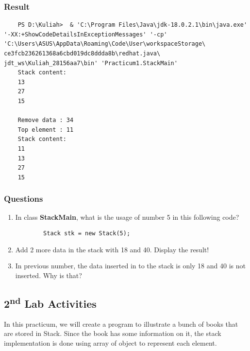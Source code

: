 \documentclass[12pt,titlepage]{article}
\begin{document}
\subsubsection{Result}

\begin{verbatim}
    PS D:\Kuliah>  & 'C:\Program Files\Java\jdk-18.0.2.1\bin\java.exe' '-XX:+ShowCodeDetailsInExceptionMessages' '-cp' 'C:\Users\ASUS\AppData\Roaming\Code\User\workspaceStorage\ ce3fcb236261368a6cbd019dc8ddda8b\redhat.java\ jdt_ws\Kuliah_28156aa7\bin' 'Practicum1.StackMain'
    Stack content: 
    13 
    27
    15

    Remove data : 34
    Top element : 11
    Stack content: 
    11
    13
    27
    15
\end{verbatim}

\subsubsection{Questions}

\begin{enumerate}
    \item In class \textbf{StackMain}, what is the usage of number 5 in this following code?
    \begin{verbatim}
        Stack stk = new Stack(5);
    \end{verbatim}
    \item Add 2 more data in the stack with 18 and 40. Display the result!
    \item In previous number, the data inserted in to the stack is only 18 and 40 is not inserted. Why is that?
\end{enumerate}

\subsection{2\textsuperscript{nd} Lab Activities}
In this practicum, we will create a program to illustrate a bunch of books that are stored in Stack. Since the book has some information on it, the stack implementation is done using array of object to represent each element.
\end{document}
